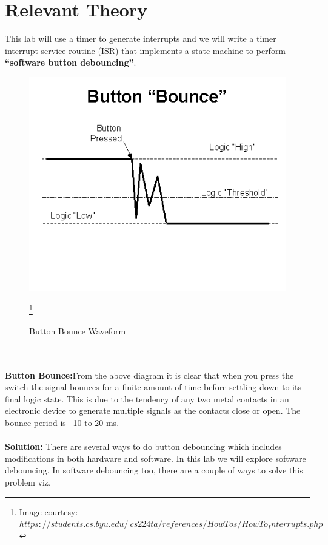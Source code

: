 \documentclass{article} %
\begin{document}
\newpage
\section {Relevant Theory}

This lab will use a timer to generate interrupts and we will write a timer interrupt service routine (ISR) that implements a state machine to perform \textbf{“software button debouncing”}.
\begin{figure}
\centering
\includegraphics[scale=0.8]{buttonBounce.gif}
\caption{Button Bounce Waveform}
\footnote{Image courtesy: $https://students.cs.byu.edu/~cs224ta/references/HowTos/HowTo_Interrupts.php$}
\end{figure}
\\
\\
\textbf{Button Bounce:}From the above diagram it is clear that when you press the switch the signal bounces for a finite amount of time before settling down to its final logic state. This is due to the tendency of any two metal contacts in an electronic device to generate multiple signals as the contacts close or open. The bounce period is ~10 to 20 ms. 
\\
\\
\textbf{Solution: }There are several ways to do button debouncing which includes modifications in both hardware and software. In this lab we will explore software debouncing. In software debouncing too, there are a couple of ways to solve this problem viz. 
\end{document}
